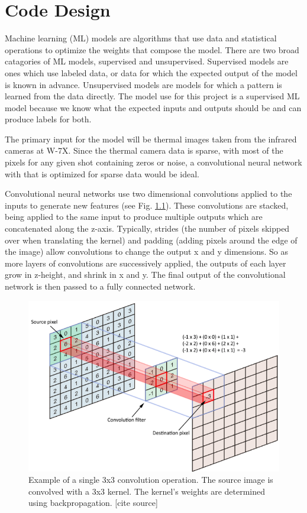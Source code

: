 %
\chapter{Code Design}
\label{sec:code:model}

Machine learning (ML) models are algorithms that use data and statistical operations to optimize the weights that compose the model.
There are two broad catagories of ML models, supervised and unsupervised.
Supervised models are ones which use labeled data, or data for which the expected output of the model is known in advance.
Unsupervised models are models for which a pattern is learned from the data directly.
The model use for this project is a supervised ML model because we know what the expected inputs and outputs should be and can produce labels for both.

The primary input for the model will be thermal images taken from the infrared cameras at W-7X.
Since the thermal camera data is sparse, with most of the pixels for any given shot containing zeros or noise, a convolutional neural network with that is optimized for sparse data would be ideal.



Convolutional neural networks use two dimensional convolutions applied to the inputs to generate new features (see Fig. \ref{fig:code:2DConv}).
These convolutions are stacked, being applied to the same input to produce multiple outputs which are concatenated along the z-axis.
Typically, strides (the number of pixels skipped over when translating the kernel) and padding (adding pixels around the edge of the image) allow convolutions to change the output x and y dimensions.
So as more layers of convolutions are successively applied, the outputs of each layer grow in z-height, and shrink in x and y.
The final output of the convolutional network is then passed to a fully connected network.


\begin{figure}[htb]
    \includegraphics[width=\textwidth]{images/2d-Conv.png}
    \caption{Example of a single 3x3 convolution operation. The source image is convolved with a 3x3 kernel. The kernel's weights are determined using backpropagation. [cite source]}
    \label{fig:code:2DConv}
\end{figure}


